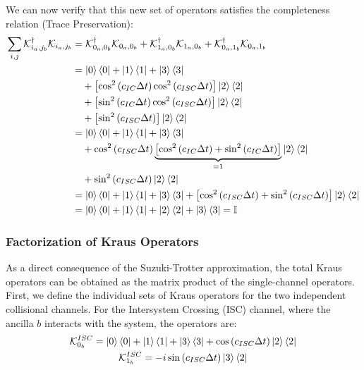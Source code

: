 \documentclass[a4paper,12pt]{article}
\begin{document}
We can now verify that this new set of operators satisfies the completeness relation (Trace Preservation):
\begin{align}
	\sum_{i,j} \mathcal{K}_{i_a, j_b}^{\dagger} \mathcal{K}_{i_a, j_b} &= \mathcal{K}_{0_a, 0_b}^{\dagger} \mathcal{K}_{0_a, 0_b} + \mathcal{K}_{1_a, 0_b}^{\dagger} \mathcal{K}_{1_a, 0_b} + \mathcal{K}_{0_a, 1_b}^{\dagger} \mathcal{K}_{0_a, 1_b} \notag \\
	&= \ket{0}\bra{0} + \ket{1}\bra{1} + \ket{3}\bra{3} \notag \\
	&\quad + \left[ \cos^2 \left( c_{IC} \Delta t \right) \cos^2 \left( c_{ISC} \Delta t \right) \right] \ket{2}\bra{2} \notag \\
	&\quad + \left[ \sin^2 \left( c_{IC} \Delta t \right) \cos^2 \left( c_{ISC} \Delta t \right) \right] \ket{2}\bra{2} \notag \\
	&\quad + \left[ \sin^2 \left( c_{ISC} \Delta t \right) \right] \ket{2}\bra{2} \notag \\
	&= \ket{0}\bra{0} + \ket{1}\bra{1} + \ket{3}\bra{3} \notag \\
	&\quad + \cos^2 \left( c_{ISC} \Delta t \right) \underbrace{\left[ \cos^2 \left( c_{IC} \Delta t \right) + \sin^2 \left( c_{IC} \Delta t \right) \right]}_{= 1} \ket{2}\bra{2} \notag \\
	&\quad + \sin^2 \left( c_{ISC} \Delta t \right) \ket{2}\bra{2} \notag \\
	&= \ket{0}\bra{0} + \ket{1}\bra{1} + \ket{3}\bra{3} + \left[ \cos^2 \left( c_{ISC} \Delta t \right) + \sin^2 \left( c_{ISC} \Delta t \right) \right] \ket{2}\bra{2} \notag \\
	&= \ket{0}\bra{0} + \ket{1}\bra{1} + \ket{2}\bra{2} + \ket{3}\bra{3} = \mathbb{I}
\end{align}

\subsubsection{Factorization of Kraus Operators}

As a direct consequence of the Suzuki-Trotter approximation, the total Kraus operators can be obtained as the matrix product of the single-channel operators.
First, we define the individual sets of Kraus operators for the two independent collisional channels. 
For the Intersystem Crossing (ISC) channel, where the ancilla $ b $ interacts with the system, the operators are:
\begin{gather}
	\mathcal{K}_{0_b}^{ISC} = \ket{0}\bra{0} + \ket{1}\bra{1} + \ket{3}\bra{3} + \cos \left( c_{ISC} \Delta t \right) \ket{2}\bra{2} \\
	\mathcal{K}_{1_b}^{ISC} = -i \sin \left( c_{ISC} \Delta t \right) \ket{3}\bra{2}
\end{gather}
\end{document}
